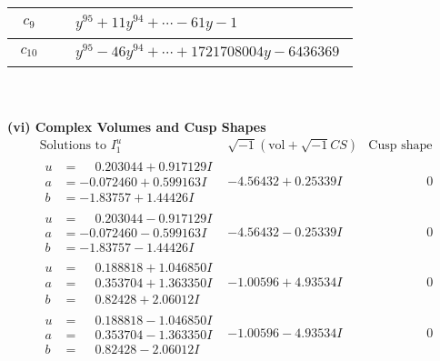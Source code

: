 \documentclass[1p]{elsarticle_modified}
\theoremstyle{definition}
\newcommand{\I}{\sqrt{-1}}
\begin{document}
\begin{tabular}{m{50pt}|m{274pt}}
\hline $$\begin{aligned}c_{9}\end{aligned}$$&$\begin{aligned}
&y^{95}+11 y^{94}+\cdots-61 y-1
\end{aligned}$\\
\hline $$\begin{aligned}c_{10}\end{aligned}$$&$\begin{aligned}
&y^{95}-46 y^{94}+\cdots+1721708004 y-6436369
\end{aligned}$\\
\hline
\end{tabular}\\~\\
\newpage\flushleft \textbf{(vi) Complex Volumes and Cusp Shapes}
$$\begin{array}{c|c|c}  
\text{Solutions to }I^u_{1}& \I (\text{vol} + \sqrt{-1}CS) & \text{Cusp shape}\\
 \hline 
\begin{aligned}
u &= \phantom{-}0.203044 + 0.917129 I \\
a &= -0.072460 + 0.599163 I \\
b &= -1.83757 + 1.44426 I\end{aligned}
 & -4.56432 + 0.25339 I & \phantom{-0.000000 } 0 \\ \hline\begin{aligned}
u &= \phantom{-}0.203044 - 0.917129 I \\
a &= -0.072460 - 0.599163 I \\
b &= -1.83757 - 1.44426 I\end{aligned}
 & -4.56432 - 0.25339 I & \phantom{-0.000000 } 0 \\ \hline\begin{aligned}
u &= \phantom{-}0.188818 + 1.046850 I \\
a &= \phantom{-}0.353704 + 1.363350 I \\
b &= \phantom{-}0.82428 + 2.06012 I\end{aligned}
 & -1.00596 + 4.93534 I & \phantom{-0.000000 } 0 \\ \hline\begin{aligned}
u &= \phantom{-}0.188818 - 1.046850 I \\
a &= \phantom{-}0.353704 - 1.363350 I \\
b &= \phantom{-}0.82428 - 2.06012 I\end{aligned}
 & -1.00596 - 4.93534 I & \phantom{-0.000000 } 0 \\ \hline\begin{aligned}

\end{aligned}
\end{array}$$
\end{document}

